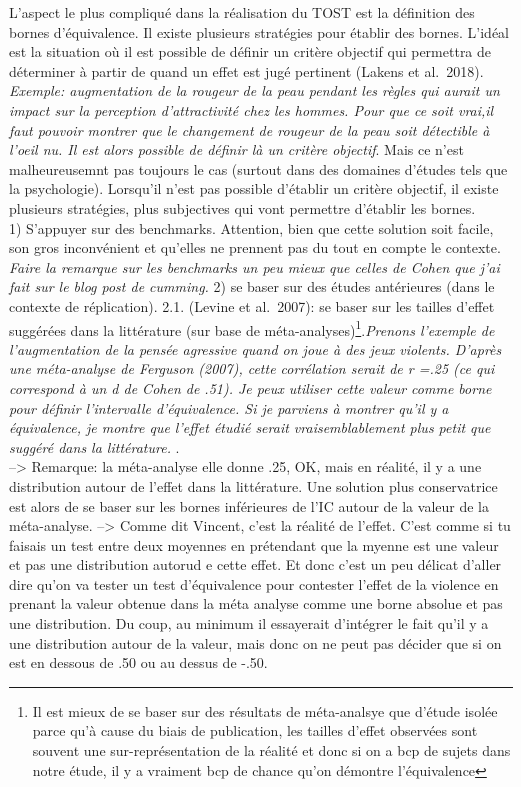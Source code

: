 \documentclass[
  english,
  man]{apa6}
\begin{document}
L'aspect le plus compliqué dans la réalisation du TOST est la définition des bornes d'équivalence. Il existe plusieurs stratégies pour établir des bornes. L'idéal est la situation où il est possible de définir un critère objectif qui permettra de déterminer à partir de quand un effet est jugé pertinent (Lakens et al.~2018). \emph{Exemple: augmentation de la rougeur de la peau pendant les règles qui aurait un impact sur la perception d'attractivité chez les hommes. Pour que ce soit vrai,il faut pouvoir montrer que le changement de rougeur de la peau soit détectible à l'oeil nu. Il est alors possible de définir là un critère objectif}. Mais ce n'est malheureusemnt pas toujours le cas (surtout dans des domaines d'études tels que la psychologie). Lorsqu'il n'est pas possible d'établir un critère objectif, il existe plusieurs stratégies, plus subjectives qui vont permettre d'établir les bornes.\\
1) S'appuyer sur des benchmarks. Attention, bien que cette solution soit facile, son gros inconvénient et qu'elles ne prennent pas du tout en compte le contexte. \emph{Faire la remarque sur les benchmarks un peu mieux que celles de Cohen que j'ai fait sur le blog post de cumming.}
2) se baser sur des études antérieures (dans le contexte de réplication).
2.1. (Levine et al.~2007): se baser sur les tailles d'effet suggérées dans la littérature (sur base de méta-analyses)\footnote{Il est mieux de se baser sur des résultats de méta-analsye que d'étude isolée parce qu'à cause du biais de publication, les tailles d'effet observées sont souvent une sur-représentation de la réalité et donc si on a bcp de sujets dans notre étude, il y a vraiment bcp de chance qu'on démontre l'équivalence}.\emph{Prenons l'exemple de l'augmentation de la pensée agressive quand on joue à des jeux violents. D'après une méta-analyse de Ferguson (2007), cette corrélation serait de r =.25 (ce qui correspond à un d de Cohen de .51). Je peux utiliser cette valeur comme borne pour définir l'intervalle d'équivalence. Si je parviens à montrer qu'il y a équivalence, je montre que l'effet étudié serait vraisemblablement plus petit que suggéré dans la littérature. }.\\
--\textgreater{} Remarque: la méta-analyse elle donne .25, OK, mais en réalité, il y a une distribution autour de l'effet dans la littérature. Une solution plus conservatrice est alors de se baser sur les bornes inférieures de l'IC autour de la valeur de la méta-analyse.
--\textgreater{} Comme dit Vincent, c'est la réalité de l'effet. C'est comme si tu faisais un test entre deux moyennes en prétendant que la myenne est une valeur et pas une distribution autorud e cette effet. Et donc c'est un peu délicat d'aller dire qu'on va tester un test d'équivalence pour contester l'effet de la violence en prenant la valeur obtenue dans la méta analyse comme une borne absolue et pas une distribution. Du coup, au minimum il essayerait d'intégrer le fait qu'il y a une distribution autour de la valeur, mais donc on ne peut pas décider que si on est en dessous de .50 ou au dessus de -.50.\\
\end{document}
